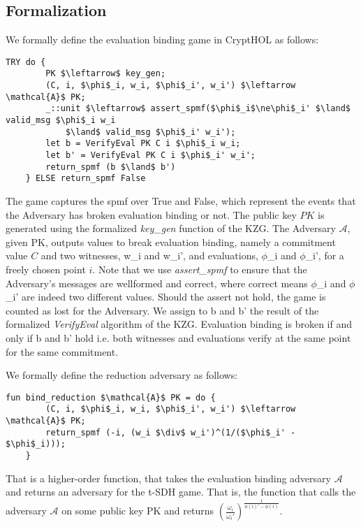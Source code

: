 \subsection*{Formalization}
\label{security:binding:formalization}
We formally define the evaluation binding game in CryptHOL as follows:
\begin{lstlisting}[language=isabelle]
    TRY do {
        PK $\leftarrow$ key_gen;
        (C, i, $\phi$_i, w_i, $\phi$_i', w_i') $\leftarrow \mathcal{A}$ PK;
        _::unit $\leftarrow$ assert_spmf($\phi$_i$\ne\phi$_i' $\land$ valid_msg $\phi$_i w_i 
            $\land$ valid_msg $\phi$_i' w_i');
        let b = VerifyEval PK C i $\phi$_i w_i;
        let b' = VerifyEval PK C i $\phi$_i' w_i';
        return_spmf (b $\land$ b')
    } ELSE return_spmf False
\end{lstlisting}
The game captures the spmf over True and False, which represent the events that the Adversary has broken evaluation binding or not.
The public key $PK$ is generated using the formalized \textit{key\_gen} function of the KZG. The Adversary $\mathcal{A}$, given PK, outputs values to break evaluation binding, namely a commitment value $C$ and two witnesses, w\_i and w\_i', and evaluations, $\phi$\_i and $\phi$\_i',  for a freely chosen point $i$. 
Note that we use \textit{assert\_spmf} to ensure that the Adversary's messages are wellformed and correct, where correct means $\phi$\_i and $\phi$\_i' are indeed two different values. Should the assert not hold, the game is counted as lost for the Adversary.
We assign to b and b' the result of the formalized \textit{VerifyEval} algorithm of the KZG. Evaluation binding is broken if and only if b and b' hold i.e. both witnesses and evaluations verify at the same point for the same commitment.

We formally define the reduction adversary as follows:
\begin{lstlisting}[language=isabelle]
    fun bind_reduction $\mathcal{A}$ PK = do {
        (C, i, $\phi$_i, w_i, $\phi$_i', w_i') $\leftarrow \mathcal{A}$ PK;
        return_spmf (-i, (w_i $\div$ w_i')^(1/($\phi$_i' - $\phi$_i)));
    }
\end{lstlisting}
That is a higher-order function, that takes the evaluation binding adversary $\mathcal{A}$ and returns an adversary for the t-SDH game.
That is, the function that calls the adversary $\mathcal{A}$ on some public key PK and returns $(\frac{\omega_i}{\omega_i'})^{\frac{1}{\phi(i)'-\phi(i)}}$. 

